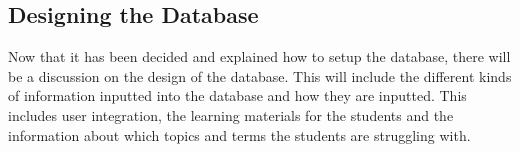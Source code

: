 \subsection{Designing the Database}

Now that it has been decided and explained how to setup the database, there will be a discussion on the design of the database. This will include the different kinds of information inputted into the database and how they are inputted. This includes user integration, the learning materials for the students and the information about which topics and terms the students are struggling with.